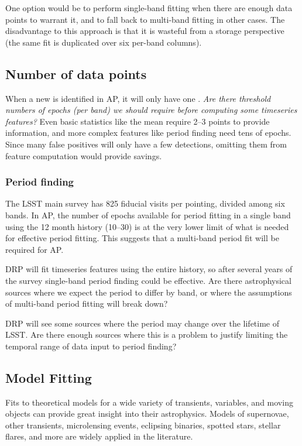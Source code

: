\documentclass[DM,authoryear,toc]{lsstdoc}
\begin{document}
One option would be to perform single-band fitting when there are enough data points to warrant it, and to fall back to multi-band fitting in other cases.
The disadvantage to this approach is that it is wasteful from a storage perspective (the same fit is duplicated over six per-band columns).


\subsection{Number of data points}

When a new \DIAObject is identified in AP, it will only have one \DIASource.
\textit{Are there threshold numbers of epochs (per band) we should require before computing some timeseries features?}
Even basic statistics like the mean require 2--3 points to provide information, and more complex features like period finding need tens of epochs.
Since many false positives will only have a few detections, omitting them from feature computation would provide savings.

\subsubsection{Period finding}

The LSST main survey has 825 fiducial visits per pointing, divided among six bands.  
In AP, the number of epochs available for period fitting in a single band using the 12 month \DIASource history (10--30) is at the very lower limit of what is needed for effective period fitting.  
This suggests that a multi-band period fit will be required for AP.

DRP will fit timeseries features using the entire \DIASource history, so after several years of the survey single-band period finding could be effective.
Are there astrophysical sources where we expect the period to differ by band, or where the assumptions of multi-band period fitting will break down?

DRP will see some sources where the period may change over the lifetime of LSST.
Are there enough sources where this is a problem to justify limiting the temporal range of data input to period finding?


\subsection{Model Fitting}

Fits to theoretical models for a wide variety of transients, variables, and moving objects can provide great insight into their astrophysics.
Models of supernovae, other transients, microlensing events, eclipsing binaries, spotted stars, stellar flares, and more are widely applied in the literature.
\end{document}
